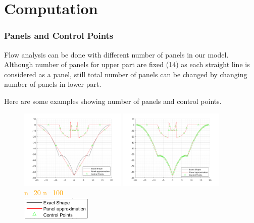 \documentclass{article}
\begin{document}
\section{Computation}

\subsubsection{Panels and Control Points}
    Flow analysis can be done with different number of panels in our model.
    Although number of panels for upper part are fixed (14) as each straight line is considered as a panel, still total number of panels can be changed by changing number of panels in lower part.
    
    \vspace{8mm}
    \hspace{20mm}
    Here are some examples showing number of panels and control points.
    \vspace{-1mm}

    \begin{figure}[htb]
    \centering  
      \includegraphics[width=0.45\textwidth]{assets/n20.png}
      \includegraphics[width=0.45\textwidth]{assets/n100.png}
       \centering
       \\  \vspace{2mm}
             \textcolor{Orange}{n=20}
               \hspace{60mm} 
                 \textcolor{Orange}{n=100}
                 \\
                  \includegraphics[width=0.3\textwidth]{assets/legends.png}
       \vspace{-2mm}
    \end{figure}
    
\end{document}
